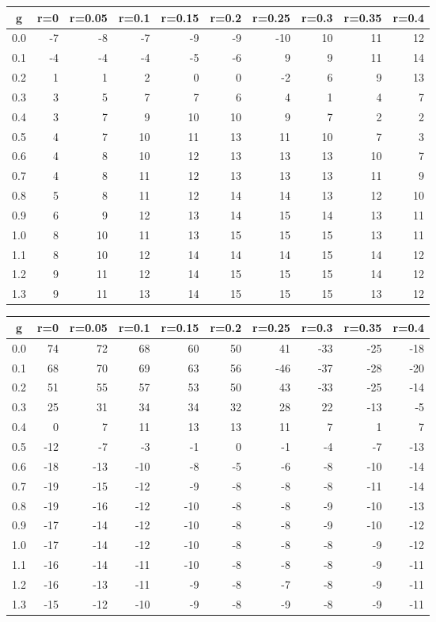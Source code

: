 %
\begin{table}[!tbp]
 \begin{center}
 \begin{tabular}{rrrrrrrrrr}\hline\hline
\multicolumn{1}{c}{g}&\multicolumn{1}{c}{r=0}&\multicolumn{1}{c}{r=0.05}&\multicolumn{1}{c}{r=0.1}&\multicolumn{1}{c}{r=0.15}&\multicolumn{1}{c}{r=0.2}&\multicolumn{1}{c}{r=0.25}&\multicolumn{1}{c}{r=0.3}&\multicolumn{1}{c}{r=0.35}&\multicolumn{1}{c}{r=0.4}\tabularnewline
\hline
0.0&-7&-8&-7&-9&-9&-10&10&11&12\tabularnewline
0.1&-4&-4&-4&-5&-6&  9& 9&11&14\tabularnewline
0.2& 1& 1& 2& 0& 0& -2& 6& 9&13\tabularnewline
0.3& 3& 5& 7& 7& 6&  4& 1& 4& 7\tabularnewline
0.4& 3& 7& 9&10&10&  9& 7& 2& 2\tabularnewline
0.5& 4& 7&10&11&13& 11&10& 7& 3\tabularnewline
0.6& 4& 8&10&12&13& 13&13&10& 7\tabularnewline
0.7& 4& 8&11&12&13& 13&13&11& 9\tabularnewline
0.8& 5& 8&11&12&14& 14&13&12&10\tabularnewline
0.9& 6& 9&12&13&14& 15&14&13&11\tabularnewline
1.0& 8&10&11&13&15& 15&15&13&11\tabularnewline
1.1& 8&10&12&14&14& 14&15&14&12\tabularnewline
1.2& 9&11&12&14&15& 15&15&14&12\tabularnewline
1.3& 9&11&13&14&15& 15&15&13&12\tabularnewline
\hline
\end{tabular}

\end{center}

\end{table}

%
\begin{table}[!tbp]
 \begin{center}
 \begin{tabular}{rrrrrrrrrr}\hline\hline
\multicolumn{1}{c}{g}&\multicolumn{1}{c}{r=0}&\multicolumn{1}{c}{r=0.05}&\multicolumn{1}{c}{r=0.1}&\multicolumn{1}{c}{r=0.15}&\multicolumn{1}{c}{r=0.2}&\multicolumn{1}{c}{r=0.25}&\multicolumn{1}{c}{r=0.3}&\multicolumn{1}{c}{r=0.35}&\multicolumn{1}{c}{r=0.4}\tabularnewline
\hline
0.0& 74& 72& 68& 60&50& 41&-33&-25&-18\tabularnewline
0.1& 68& 70& 69& 63&56&-46&-37&-28&-20\tabularnewline
0.2& 51& 55& 57& 53&50& 43&-33&-25&-14\tabularnewline
0.3& 25& 31& 34& 34&32& 28& 22&-13& -5\tabularnewline
0.4&  0&  7& 11& 13&13& 11&  7&  1&  7\tabularnewline
0.5&-12& -7& -3& -1& 0& -1& -4& -7&-13\tabularnewline
0.6&-18&-13&-10& -8&-5& -6& -8&-10&-14\tabularnewline
0.7&-19&-15&-12& -9&-8& -8& -8&-11&-14\tabularnewline
0.8&-19&-16&-12&-10&-8& -8& -9&-10&-13\tabularnewline
0.9&-17&-14&-12&-10&-8& -8& -9&-10&-12\tabularnewline
1.0&-17&-14&-12&-10&-8& -8& -8& -9&-12\tabularnewline
1.1&-16&-14&-11&-10&-8& -8& -8& -9&-11\tabularnewline
1.2&-16&-13&-11& -9&-8& -7& -8& -9&-11\tabularnewline
1.3&-15&-12&-10& -9&-8& -9& -8& -9&-11\tabularnewline
\hline
\end{tabular}

\end{center}

\end{table}

